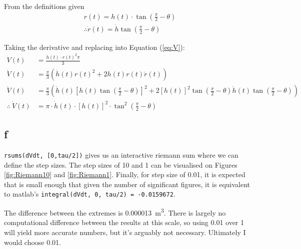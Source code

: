 From the definitions given
\begin{equation*}
\begin{split}
    r(t) = h(t) \cdot \tan\left( \frac{\pi}{2} - \theta \right) \\
    \therefore \dot{r}(t) = \dot{h}\tan\left( \frac{\pi}{2} - \theta \right)
\end{split}
\end{equation*}

Taking the derivative and replacing into Equation (\ref{eq:V}):
\begin{equation}\begin{split}
    V(t) &= \frac{h(t) \cdot {r(t)}^2 \pi}{3} \\
    \dot{V}(t) &= \frac{\pi}{3} \left(
        \dot{h}(t) {r(t)}^2 + 2h(t)r(t) \dot{r}(t)
    \right) \\
    \dot{V}(t) &= \frac{\pi}{3} \left(
        \dot{h}(t) \left[
             h(t)\tan\left( \frac{\pi}{2} - \theta \right)
        \right]^2
        + 2{\left[h(t)\right]}^2 \tan\left( \frac{\pi}{2} - \theta \right) \dot{h}(t) \tan\left( \frac{\pi}{2} - \theta \right)
    \right) \\
    \therefore \ \dot{V}(t) &= \pi \cdot \dot{h}(t) \cdot {\left[ h(t) \right]}^2 \cdot \tan^2\left( \frac{\pi}{2} - \theta \right)
\end{split}
\end{equation}

\subsection{f}


\texttt{rsums(dVdt, [0,tau/2])} gives us an interactive riemann sum where we can define the step sizes.
The step sizes of 10 and 1 can be visualised on Figures \ref{fig:Riemann10} and \ref{fig:Riemann1}.
Finally, for step size of 0.01, it is expected that is small enough that given the number of significant figures, it is equivalent to matlab's \texttt{integral(dVdt, 0, tau/2) = -0.0159672}.

The difference between the extremes is \SI{0.000013}{\cubic\meter}. There is largely no computational difference between the results at this scale, so using 0.01 over 1 will yield more accurate numbers, but it's arguably not necessary. Ultimately I would choose 0.01.

